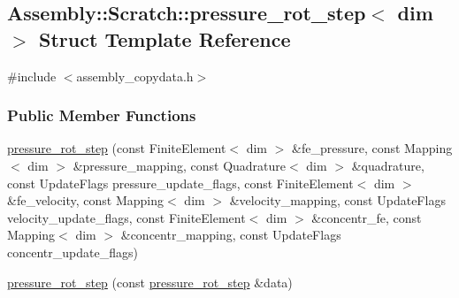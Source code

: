 \hypertarget{struct_assembly_1_1_scratch_1_1pressure__rot__step}{}\subsection{Assembly\+:\+:Scratch\+:\+:pressure\+\_\+rot\+\_\+step$<$ dim $>$ Struct Template Reference}
\label{struct_assembly_1_1_scratch_1_1pressure__rot__step}


{\ttfamily \#include $<$assembly\+\_\+copydata.\+h$>$}

\subsubsection*{Public Member Functions}
\begin{DoxyCompactItemize}
\item 
\hyperlink{struct_assembly_1_1_scratch_1_1pressure__rot__step_a9a782a85d4cfb0b5f50a0fcd76924d23}{pressure\+\_\+rot\+\_\+step} (const Finite\+Element$<$ dim $>$ \&fe\+\_\+pressure, const Mapping$<$ dim $>$ \&pressure\+\_\+mapping, const Quadrature$<$ dim $>$ \&quadrature, const Update\+Flags pressure\+\_\+update\+\_\+flags, const Finite\+Element$<$ dim $>$ \&fe\+\_\+velocity, const Mapping$<$ dim $>$ \&velocity\+\_\+mapping, const Update\+Flags velocity\+\_\+update\+\_\+flags, const Finite\+Element$<$ dim $>$ \&concentr\+\_\+fe, const Mapping$<$ dim $>$ \&concentr\+\_\+mapping, const Update\+Flags concentr\+\_\+update\+\_\+flags)
\item 
\hyperlink{struct_assembly_1_1_scratch_1_1pressure__rot__step_ad8ce0533193a2013774b98c0e7b81581}{pressure\+\_\+rot\+\_\+step} (const \hyperlink{struct_assembly_1_1_scratch_1_1pressure__rot__step}{pressure\+\_\+rot\+\_\+step} \&data)
\end{DoxyCompactItemize}
